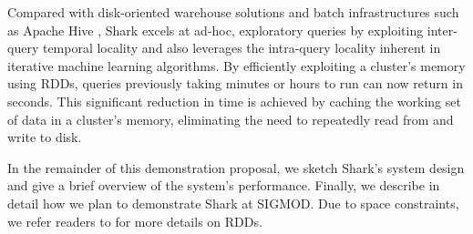 \documentclass[preprint]{acm_proc_article-sp}
\newcommand{\eg}{{\em e.g.,}~}
\begin{document}
Compared with disk-oriented warehouse solutions and batch infrastructures such as Apache Hive \cite{hive}, Shark excels at ad-hoc, exploratory queries by exploiting inter-query temporal locality and also leverages the intra-query locality inherent in iterative machine learning algorithms. By efficiently exploiting a cluster's memory using RDDs, queries previously taking minutes or hours to run can now return in seconds. This significant reduction in time is achieved by caching the working set of data in a cluster's memory, eliminating the need to repeatedly read from and write to disk.

In the remainder of this demonstration proposal, we sketch Shark's system design and give a brief overview of the system's performance. Finally, we describe in detail how we plan to demonstrate Shark at SIGMOD. Due to space constraints, we refer readers to \cite{spark-tr} for more details on RDDs.


\end{document}
